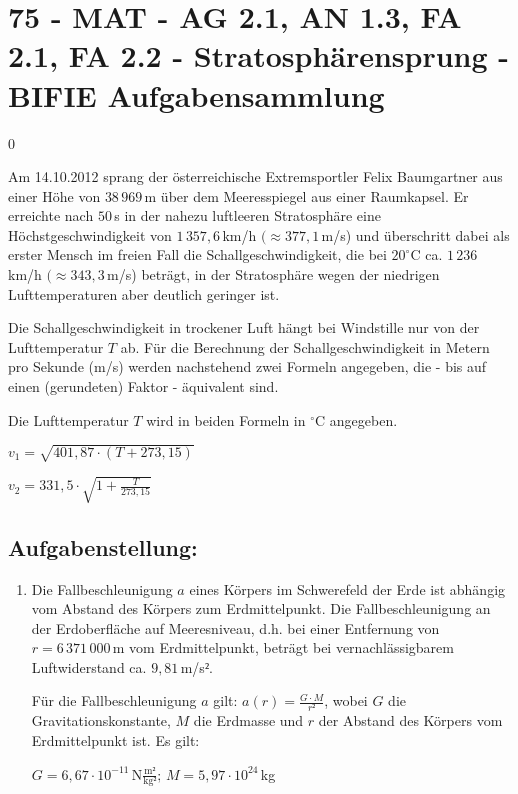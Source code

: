 \section{75 - MAT - AG 2.1, AN 1.3, FA 2.1, FA 2.2 - Stratosphärensprung - BIFIE Aufgabensammlung}

\begin{langesbeispiel} \item[0] %
	
Am 14.10.2012 sprang der österreichische Extremsportler Felix Baumgartner aus einer Höhe von $38\,969$\,m über dem Meeresspiegel aus einer Raumkapsel. Er erreichte nach $50$\,s in der nahezu luftleeren Stratosphäre eine Höchstgeschwindigkeit von $1\,357,6$\,km/h $(\approx 377,1$\,m/s) und überschritt dabei als erster Mensch im freien Fall die Schallgeschwindigkeit, die bei $20^\circ$C ca. $1\,236$\,km/h $(\approx 343,3$\,m/s) beträgt, in der Stratosphäre wegen der niedrigen Lufttemperaturen aber deutlich geringer ist.\leer

Die Schallgeschwindigkeit in trockener Luft hängt bei Windstille nur von der Lufttemperatur $T$ ab. Für die Berechnung der Schallgeschwindigkeit in Metern pro Sekunde (m/s) werden nachstehend zwei Formeln angegeben, die - bis auf einen (gerundeten) Faktor - äquivalent sind.

Die Lufttemperatur $T$ wird in beiden Formeln in $^\circ$C angegeben.\leer

$v_1=\sqrt{401,87\cdot (T+273,15)}$

$v_2=331,5\cdot\sqrt{1+\frac{T}{273,15}}$

\subsection{Aufgabenstellung:}
\begin{enumerate}
	\item Die Fallbeschleunigung $a$ eines Körpers im Schwerefeld der Erde ist abhängig vom Abstand des Körpers zum Erdmittelpunkt. Die Fallbeschleunigung an der Erdoberfläche auf Meeresniveau, d.h. bei einer Entfernung von $r=6\,371\,000$\,m vom Erdmittelpunkt, beträgt bei vernachlässigbarem Luftwiderstand ca. $9,81$\,m/s$²$.
	
	Für die Fallbeschleunigung $a$ gilt: $a(r)=\frac{G\cdot M}{r²}$, wobei $G$ die Gravitationskonstante, $M$ die Erdmasse und $r$ der Abstand des Körpers vom Erdmittelpunkt ist. Es gilt:
	
	$G=6,67\cdot 10^{-11}\,\text{N}\frac{\text{m}²}{\text{kg}²}; \, M=5,97\cdot 10^{24}$\,kg
	

\end{enumerate}
\end{langesbeispiel}
